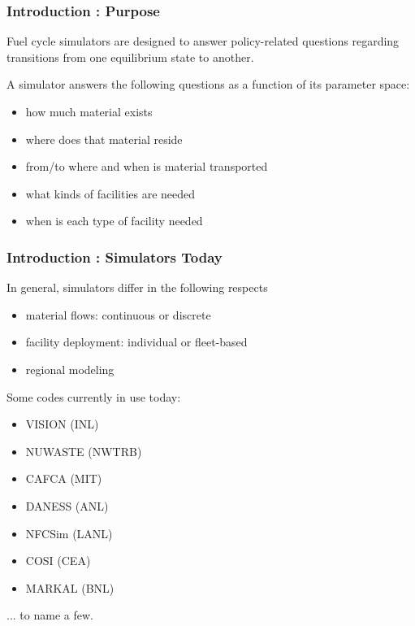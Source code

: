 
\begin{frame}[ctb!]
  \frametitle{Introduction : Purpose}
  Fuel cycle simulators are designed to answer policy-related questions
  regarding transitions from one equilibrium state to another.

  \vspace{0.2cm}

  \pause
  A simulator answers the following questions as a function of its 
  parameter space:
  \begin{itemize}
    \item how much material exists
    \item where does that material reside
    \item from/to where and when is material transported
    \item what kinds of facilities are needed
    \item when is each type of facility needed
  \end{itemize}
\end{frame}

\begin{frame}[ctb!]
  \frametitle{Introduction : Simulators Today}
  In general, simulators differ in the following respects
  \begin{itemize}
    \item material flows: continuous or discrete
    \item facility deployment: individual or fleet-based
    \item regional modeling
  \end{itemize}
  \pause
  Some codes currently in use today:
  \begin{itemize}
    \item VISION (INL)
    \item NUWASTE (NWTRB)
    \item CAFCA (MIT)
    \item DANESS (ANL)
    \item NFCSim (LANL)
    \item COSI (CEA)
    \item MARKAL (BNL)
  \end{itemize}
  ... to name a few.
\end{frame}

